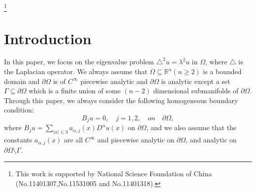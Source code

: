 \documentclass[a4paper, 12pt, onecolumn]{article} \textwidth 148mm
\begin{document}
\vspace{1cm}\fontsize{12}{22}\selectfont
\footnote{This work is supported by National Science Foundation of China (No.11401307,No.11531005 and No.11401318).}
\section{Introduction}
In this paper, we focus on the eigenvalue problem $\triangle^2u=\lambda^2u$ in $\Omega$, where $\triangle$ is the Laplacian operator. We always assume that $\Omega\subseteq\mathbb{R}^n(n\geq2)$ is a bounded domain and $\partial\Omega$ is of $C^{\infty}$ piecewise analytic and $\partial\Omega$ is analytic except a set $\Gamma\subseteq\partial\Omega$ which is a finite union of some $(n-2)$ dimensional submanifolds of $\partial\Omega$. Through this paper, we always consider the following homogeneous boundary condition:
\begin{equation}\label{boundary conditions}
B_ju=0,\quad j=1,2,\quad on \quad \partial\Omega,
\end{equation}
where $B_ju=\sum\limits_{|\alpha|\leq3}a_{\alpha,j}(x)D^{\alpha}u(x)$ on $\partial\Omega$, and we also assume that the constants $a_{\alpha,j}(x)$ are all $C^{\infty}$ and piecewise analytic on $\partial\Omega$, and analytic on $\partial\Omega\setminus\Gamma$.
\end{document}
